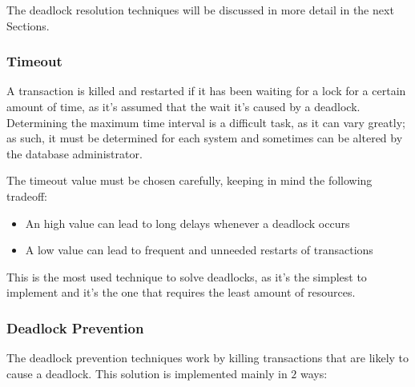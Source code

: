 \documentclass[english]{article}
\begin{document}
The deadlock resolution techniques will be discussed in more detail in the next Sections.

\subsubsection{Timeout}

A transaction is killed and restarted if it has been waiting for a lock for a certain amount of time, as it's assumed that the wait it's caused by a deadlock.
Determining the maximum time interval is a difficult task, as it can vary greatly;
as such, it must be determined for each system and sometimes can be altered by the database administrator.

The timeout value must be chosen carefully, keeping in mind the following tradeoff:

\begin{itemize}
  \item An high value can lead to long delays whenever a deadlock occurs
  \item A low value can lead to frequent and unneeded restarts of transactions
\end{itemize}

This is the most used technique to solve deadlocks, as it's the simplest to implement and it's the one that requires the least amount of resources.

\subsubsection{Deadlock Prevention}

The deadlock prevention techniques work by killing transactions that are likely to cause a deadlock.
This solution is implemented mainly in \(2\) ways:
\end{document}
